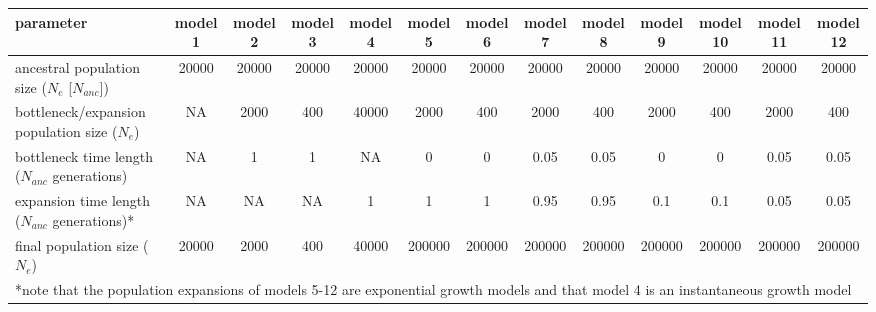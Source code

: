 \begin{tabular}{ | l | c | c | c | c | c | c | c | c | c | c | c | c | }
\hline
	\textbf{parameter} & \textbf{model 1} & \textbf{model 2} & \textbf{model 3} & \textbf{model 4} & \textbf{model 5} & \textbf{model 6} & \textbf{model 7} & \textbf{model 8} & \textbf{model 9} & \textbf{model 10} & \textbf{model 11} & \textbf{model 12} \\ \hline
	ancestral population size ($N_e$ [$N_{anc}$]) & 20000 & 20000 & 20000 & 20000 & 20000 & 20000 & 20000 & 20000 & 20000 & 20000 & 20000 & 20000 \\ \hline
	bottleneck/expansion population size ($N_e$) & NA & 2000 & 400 & 40000 & 2000 & 400 & 2000 & 400 & 2000 & 400 & 2000 & 400 \\ \hline
	bottleneck time length ($N_{anc}$ generations) & NA & 1 & 1 & NA & 0 & 0 & 0.05 & 0.05 & 0 & 0 & 0.05 & 0.05 \\ \hline
	expansion time length ($N_{anc}$ generations)* & NA & NA & NA & 1 & 1 & 1 & 0.95 & 0.95 & 0.1 & 0.1 & 0.05 & 0.05 \\ \hline
	final population size ($N_e$) & 20000 & 2000 & 400 & 40000 & 200000 & 200000 & 200000 & 200000 & 200000 & 200000 & 200000 & 200000 \\ \hline
    \multicolumn{13}{l}{*note that the population expansions of models 5-12 are exponential growth models and that model 4 is an instantaneous growth model}
\end{tabular}
